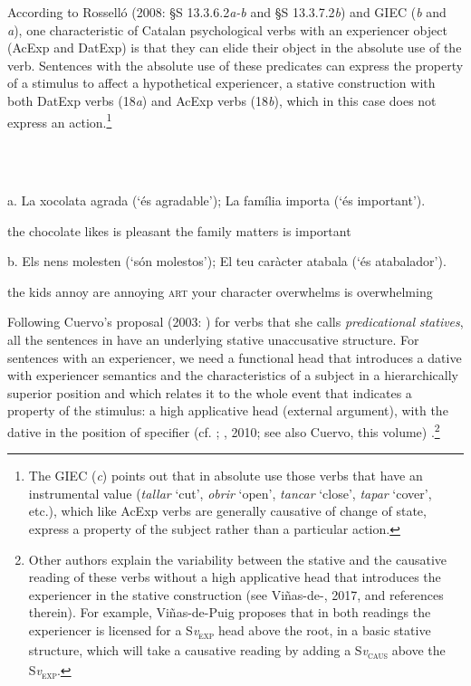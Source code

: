 \documentclass[output=paper,modfonts,nonflat]{langsci/langscibook}
\begin{document}
According to Rosselló (2008: §S 13.3.6.2\textit{a-b} and §S 13.3.7.2\textit{b}) and GIEC (\textit{b} and \textit{a}), one characteristic of Catalan psychological verbs with an experiencer object (AcExp and DatExp) is that they can elide their object in the absolute use of the verb. Sentences with the absolute use of these predicates can express the property of a stimulus to affect a hypothetical experiencer, a stative construction with both DatExp verbs (18\textit{a}) and AcExp verbs (18\textit{b}), which in this case does not express an action.\footnote{The GIEC (\textit{c}) points out that in absolute use those verbs that have an instrumental value (\textit{tallar} ‘cut’, \textit{obrir} ‘open’, \textit{tancar} ‘close’, \textit{tapar} ‘cover’, etc.), which like AcExp verbs are generally causative of change of state, express a property of the subject rather than a particular action.}

\ea%
    \label{ex:key:18}
    \gll\\
        \\
    \glt
    \z

         a. La  xocolata  agrada (‘és agradable’); La  família importa (‘és important’). 

           the chocolate likes       is  pleasant       the family  matters     is important

         b. Els nens molesten (‘són molestos’); El    teu   caràcter   atabala       (‘és atabalador’).

             the kids annoy         are annoying     \textsc{art} your character overwhelms is overwhelming

Following Cuervo’s proposal (2003:  ) for verbs that she calls \textit{predicational} \textit{statives}, all the sentences in  have an underlying stative unaccusative structure. For sentences with an experiencer, we need a functional head that introduces a dative with experiencer semantics and the characteristics of a subject in a hierarchically superior position and which relates it to the whole event that indicates a property of the stimulus: a high applicative head (external argument), with the dative in the position of specifier (cf. \citealt{Pylkkänen2008}; \citealt{Cuervo2003}, 2010; see also Cuervo, this volume) .\footnote{Other authors explain the variability between the stative and the causative reading of these verbs without a high applicative head that introduces the experiencer in the stative construction (see Viñas-de-\citealt{Puig2014}, 2017, and references therein). For example, Viñas-de-Puig proposes that in both readings the experiencer is licensed for a S\textit{v}\textsc{\textsubscript{exp}} head above the root, in a basic stative structure, which will take a causative reading by adding a S\textit{v}\textsc{\textsubscript{caus}} above the S\textit{v}\textsc{\textsubscript{exp}}.}
\end{document}
